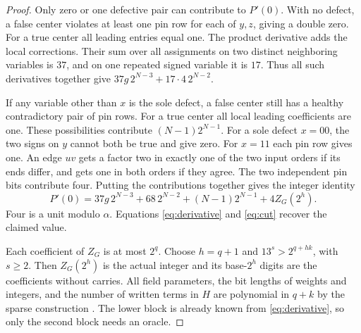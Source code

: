 \begin{proof}
Only zero or one defective pair can contribute to \(P'(0)\).
With no defect, a false center violates at least one pin row for
each of \(y,z\), giving a double zero. For a true center all leading
entries equal one. The product derivative adds the local corrections.
Their sum over all assignments on two distinct neighboring variables
is \(37\), and on one repeated signed variable it is \(17\).
Thus all such derivatives together give
\(37g\,2^{N-3}+17\cdot4\,2^{N-2}\).

If any variable other than \(x\) is the sole defect, a false center
still has a healthy contradictory pair of pin rows. For a true
center all local leading coefficients are one. These possibilities
contribute \((N-1)2^{N-1}\). For a sole defect \(x=00\), the two
signs on \(y\) cannot both be true and give zero. For \(x=11\)
each pin row gives one. An edge \(uv\) gets a factor two in exactly
one of the two input orders if its ends differ, and gets one in both
orders if they agree. The two independent pin bits contribute four.
Putting the contributions together gives the integer identity
\begin{equation}
 P'(0)=37g\,2^{N-3}+68\,2^{N-2}+(N-1)2^{N-1}
                           +4Z_G(2^h).                              \label{eq:cut}
\end{equation}
Four is a unit modulo \(\alpha\). Equations \eqref{eq:derivative}
and \eqref{eq:cut} recover the claimed value.

Each coefficient of \(Z_G\) is at most \(2^q\). Choose \(h=q+1\)
and \(13^s>2^{q+hk}\), with \(s\ge2\). Then \(Z_G(2^h)\) is the
actual integer and its base-\(2^h\) digits are the coefficients
without carries. All field parameters, the bit lengths of weights
and integers, and the number of written terms in \(H\) are polynomial
in \(q+k\) by the sparse construction \cite[Thm.~1]{degree}.
The lower block is already known from \eqref{eq:derivative}, so only
the second block needs an oracle.
\end{proof}
